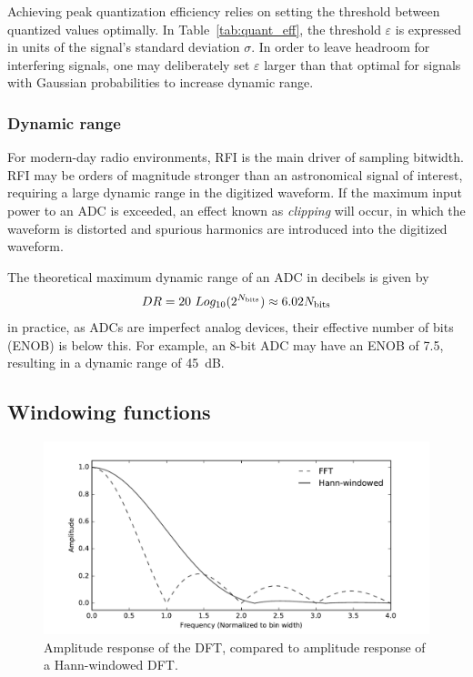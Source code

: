 \documentclass{ws-rv961x669}
\begin{document}
Achieving peak quantization efficiency relies on setting the threshold between quantized values optimally. In Table~\ref{tab:quant_eff}, the threshold $\varepsilon$ is expressed in units of the signal's standard deviation $\sigma$. In order to leave headroom for interfering signals, one may deliberately set $\varepsilon$ larger than that optimal for signals with Gaussian probabilities to increase dynamic range.


\subsubsection{Dynamic range\label{sub:dynamic-range}}

For modern-day radio environments, RFI is the main driver of sampling bitwidth. RFI may be orders of magnitude stronger than an astronomical signal of interest, requiring a large dynamic range in the digitized waveform. If the maximum input power to an ADC is exceeded, an effect known as \emph{clipping} will occur, in which the waveform is distorted and spurious harmonics are introduced into the digitized waveform.

The theoretical maximum dynamic range of an ADC in decibels is given by 
\begin{equation}
	DR = 20~Log_{10}(2^{N_{\rm{bits}}}) \approx 6.02 N_{\rm{bits}}
\end{equation}
in practice, as ADCs are imperfect analog devices, their effective number of bits (ENOB) is below this. For example, an 8-bit ADC may have an ENOB of 7.5, resulting in a dynamic range of 45~dB.



\subsection{Windowing functions}

\begin{figure}[t]
 \centering
 \includegraphics[width=\textwidth]{./figures/fft_resp}
 
 \caption{Amplitude response of the DFT, compared to amplitude response of a Hann-windowed DFT. \label{fig:fft_resp}}
\end{figure}
\end{document}
